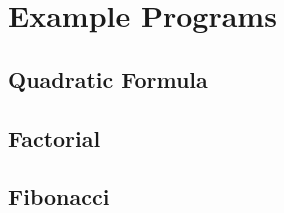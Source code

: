 \documentclass{article}
\begin{document}
    \section{Example Programs}
    
    \subsection{Quadratic Formula}
    

    \subsection{Factorial}
    

    \subsection{Fibonacci}
    
    
    
\end{document}
